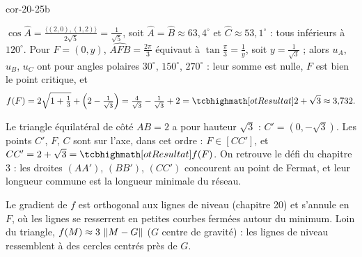 \begin{blocLivre}{cor-20-25b}
\begin{corrigeSuite}
\begin{questions}[start=6]
  \item $\cos\widehat A=\frac{\langle(2,0),(1,2)\rangle}{2\sqrt5}=\frac{1}{\sqrt5}$,
    soit $\widehat A=\widehat B\approx63{,}4^{\circ}$ et
    $\widehat C\approx53{,}1^{\circ}$ : tous inférieurs à $120^{\circ}$.
    Pour $F=(0,y)$, $\widehat{AFB}=\frac{2\pi}{3}$ équivaut à
    $\tan\frac\pi3=\frac1y$, soit $y=\frac{1}{\sqrt3}$ ; alors $u_A$, $u_B$,
    $u_C$ ont pour angles polaires $30^{\circ}$, $150^{\circ}$, $270^{\circ}$ :
    leur somme est nulle, $F$ est bien le point critique, et
    \[
    f(F)=2\sqrt{1+\tfrac13}+\Bigl(2-\tfrac{1}{\sqrt3}\Bigr)
    =\tfrac{4}{\sqrt3}-\tfrac{1}{\sqrt3}+2=\res{2+\sqrt3}\approx3{,}732 .
    \]
  \item Le triangle équilatéral de côté $AB=2$ a pour hauteur $\sqrt3$ :
    $C'=(0,-\sqrt3)$. Les points $C'$, $F$, $C$ sont sur l'axe, dans cet
    ordre : $F\in[CC']$, et $CC'=2+\sqrt3=\res{f(F)}$. On retrouve le défi
    du chapitre 3 : les droites $(AA')$, $(BB')$, $(CC')$ concourent au point
    de Fermat, et leur longueur commune est la longueur minimale du
    réseau.
  \item Le gradient de $f$ est orthogonal aux lignes de niveau (chapitre 20)
    et s'annule en $F$, où les lignes se resserrent en petites courbes
    fermées autour du minimum. Loin du triangle,
    $f(M)\approx3\,\left\lVert M-G\right\rVert$ ($G$ centre de gravité) : les lignes de
    niveau ressemblent à des cercles centrés près de $G$.
\end{questions}
\end{corrigeSuite}
\end{blocLivre}
